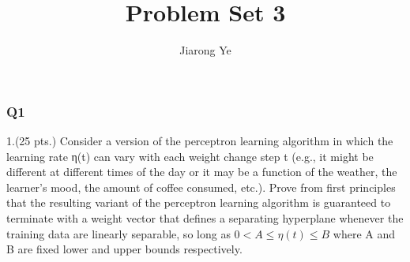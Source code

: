 \documentclass[11pt]{article}
\title{Problem Set 3}
\author{Jiarong Ye}
\begin{document}
    
    
    \maketitle
    
    

    
    \subsubsection*{Q1}\label{q1}

    1.(25 pts.) Consider a version of the perceptron learning algorithm in
which the learning rate η(t) can vary with each weight change step t
(e.g., it might be different at different times of the day or it may be
a function of the weather, the learner's mood, the amount of coffee
consumed, etc.). Prove from first principles that the resulting variant
of the perceptron learning algorithm is guaranteed to terminate with a
weight vector that defines a separating hyperplane whenever the training
data are linearly separable, so long as \(0 < A ≤ \eta(t) ≤ B\) where A
and B are fixed lower and upper bounds respectively.
\end{document}
